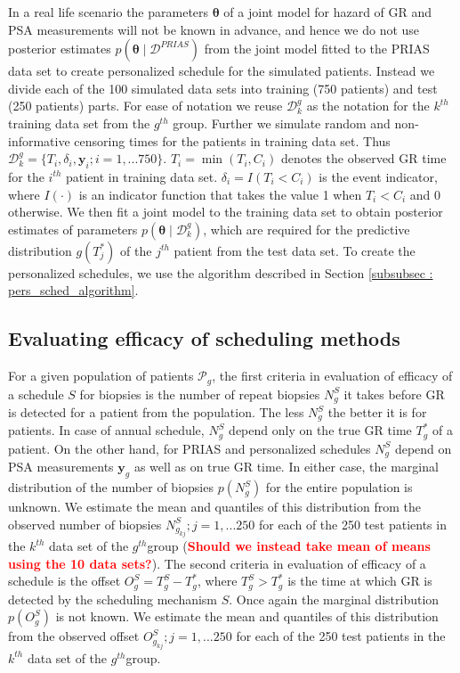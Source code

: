 In a real life scenario the parameters $\boldsymbol{\theta}$ of a joint model for hazard of GR and PSA measurements will not be known in advance, and hence we do not use posterior estimates $p(\boldsymbol{\theta} \mid \mathcal{D}^{PRIAS})$ from the joint model fitted to the PRIAS data set to create personalized schedule for the simulated patients. Instead we divide each of the 100 simulated data sets into training (750 patients) and test (250 patients) parts. For ease of notation we reuse $\mathcal{D}^g_k$ as the notation for the $k^{th}$ training data set from the $g^{th}$ group. Further we simulate random and non-informative censoring times for the patients in training data set. Thus $\mathcal{D}^g_k = \{T_i, \delta_i, \boldsymbol{y}_i; i = 1,...750\}$. $T_i = \min(T_i, C_i)$ denotes the observed GR time for the $i^{th}$ patient in training data set. $\delta_i = I(T_i < C_i)$ is the event indicator, where $I(\cdot)$ is an indicator function that takes the value 1 when $T_i < C_i$ and 0 otherwise. We then fit a joint model to the training data set to obtain posterior estimates of parameters $p(\boldsymbol{\theta} \mid \mathcal{D}^g_k)$, which are required for the predictive distribution $g(T^*_j)$ of the $j^{th}$ patient from the test data set. To create the personalized schedules, we use the algorithm described in Section \ref{subsubsec : pers_sched_algorithm}.

\subsection{Evaluating efficacy of scheduling methods}
For a given population of patients $\mathcal{P}_g$, the first criteria in evaluation of efficacy of a schedule $S$ for biopsies is the number of repeat biopsies $N^S_g$ it takes before GR is detected for a patient from the population. The less $N^S_g$ the better it is for patients. In case of annual schedule, $N^S_g$ depend only on the true GR time $T^*_g$ of a patient. On the other hand, for PRIAS and personalized schedules $N^S_g$ depend on PSA measurements $\boldsymbol{y}_g$ as well as on true GR time. In either case, the marginal distribution of the number of biopsies $p(N^S_g)$ for the entire population is unknown. We estimate the mean and quantiles of this distribution from the observed number of biopsies $N^S_{g_{kj}}; j=1,...250$ for each of the 250 test patients in the $k^{th}$ data set of the $g^{th}$group (\textcolor{red}{\textbf{Should we instead take mean of means using the 10 data sets?}}). The second criteria in evaluation of efficacy of a schedule is the offset $O^S_g = T^S_g - T^*_g$, where $T^S_g > T^*_g$ is the time at which GR is detected by the scheduling mechanism $S$. Once again the marginal distribution $p(O^S_g)$ is not known. We estimate the mean and quantiles of this distribution from the observed offset $O^S_{g_{kj}}; j=1,...250$ for each of the 250 test patients in the $k^{th}$ data set of the $g^{th}$group.\\

